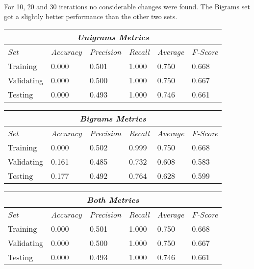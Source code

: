 \documentclass[11pt]{article}
\begin{document}
For 10, 20 and 30 iterations no considerable changes were found. The Bigrams set got a slightly better performance than the other two sets.

\begin{tabular}{ |p{2cm}||p{2cm}|p{2cm}|p{2cm}|p{2cm}|p{2cm}|  }
 \hline
 \multicolumn{6}{|c|}{\textbf{\textit{Unigrams Metrics}}} \\
 \hline
 \textit{Set} & \textit{Accuracy} & \textit{Precision} & \textit{Recall} & \textit{Average} & \textit{F-Score} \\
 \hline
 Training   & 0.000 & 0.501 & 1.000 & 0.750 & 0.668 \\
 Validating & 0.000 & 0.500 & 1.000 & 0.750 & 0.667 \\
 Testing    & 0.000 & 0.493 & 1.000 & 0.746 & 0.661 \\
 \hline
\end{tabular}

\hfill \break

\begin{tabular}{ |p{2cm}||p{2cm}|p{2cm}|p{2cm}|p{2cm}|p{2cm}|  }
 \hline
 \multicolumn{6}{|c|}{\textbf{\textit{Bigrams Metrics}}} \\
 \hline
 \textit{Set} & \textit{Accuracy} & \textit{Precision} & \textit{Recall} & \textit{Average} & \textit{F-Score} \\
 \hline
 Training   & 0.000 & 0.502 & 0.999 & 0.750 & 0.668 \\
 Validating & 0.161 & 0.485 & 0.732 & 0.608 & 0.583 \\
 Testing    & 0.177 & 0.492 & 0.764 & 0.628 & 0.599 \\
 \hline
\end{tabular}

\hfill \break

\begin{tabular}{ |p{2cm}||p{2cm}|p{2cm}|p{2cm}|p{2cm}|p{2cm}|  }
 \hline
 \multicolumn{6}{|c|}{\textbf{\textit{Both Metrics}}} \\
 \hline
 \textit{Set} & \textit{Accuracy} & \textit{Precision} & \textit{Recall} & \textit{Average} & \textit{F-Score} \\
 \hline
 Training   & 0.000 & 0.501 & 1.000 & 0.750 & 0.668 \\
 Validating & 0.000 & 0.500 & 1.000 & 0.750 & 0.667 \\
 Testing    & 0.000 & 0.493 & 1.000 & 0.746 & 0.661 \\
 \hline
\end{tabular}


%
%
\end{document}
